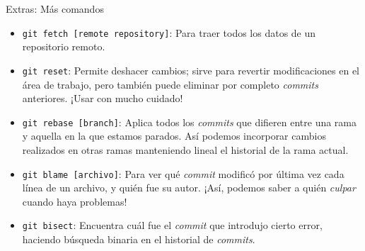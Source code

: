 \begin{frame}[t]{Extras: Más comandos}

    \begin{itemize}
        \item \texttt{git fetch [remote repository]}: Para traer todos los datos de un repositorio remoto.
        \item \texttt{git reset}: Permite deshacer cambios; sirve para revertir modificaciones en el área de trabajo, pero también puede eliminar por completo \textit{commits} anteriores. ¡Usar con mucho cuidado!
        \item \texttt{git rebase [branch]}: Aplica todos los \textit{commits} que difieren entre una rama y aquella en la que estamos parados. Así podemos incorporar cambios realizados en otras ramas manteniendo lineal el historial de la rama actual.
        \item \texttt{git blame [archivo]}: Para ver qué \textit{commit} modificó por última vez cada línea de un archivo, y quién fue su autor. ¡Así, podemos saber a quién \textit{culpar} cuando haya problemas!
        \item \texttt{git bisect}: Encuentra cuál fue el \textit{commit} que introdujo cierto error, haciendo búsqueda binaria en el historial de \textit{commits}.
    \end{itemize}

\end{frame}

